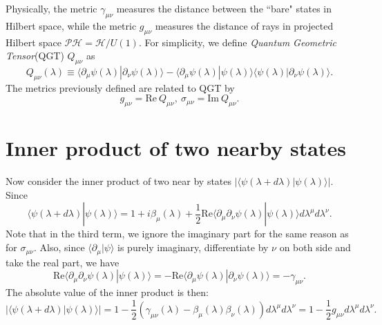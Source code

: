 \documentclass[aps,prb,superscriptaddress]{revtex4}
\begin{document}
Physically, the metric $\gamma_{\mu\nu}$ measures the distance between the ``bare" states in Hilbert space, while the metric $g_{\mu\nu}$ measures the distance of rays in projected Hilbert space $\mathcal{PH} = \mathcal H /U(1)$. For simplicity, we define \textit{Quantum Geometric Tensor}(QGT) $Q_{\mu\nu}$ as
\begin{equation}
	Q_{\mu\nu}(\lambda) \equiv 
	\langle \partial_\mu \psi(\lambda) | \partial_\nu \psi(\lambda) \rangle - 
	\langle \partial_\mu \psi(\lambda) | \psi(\lambda) \rangle 
	\langle \psi(\lambda) | \partial_\nu \psi(\lambda) \rangle.
\end{equation}  
The metrics previously defined are related to QGT by
\begin{equation}
	g_{\mu\nu} = \mathrm{Re}\ Q_{\mu\nu},\ \sigma_{\mu\nu} = \mathrm{Im}\ Q_{\mu\nu}.
\end{equation}

\section{Inner product of two nearby states}
Now consider the inner product of two near by states $|\langle \psi(\lambda+d\lambda) | \psi(\lambda) \rangle|$. Since
\begin{equation}
	\langle \psi(\lambda+d\lambda)| \psi(\lambda)\rangle
	= 1 + i\beta_\mu(\lambda)+\frac{1}{2}\mathrm{Re}\langle \partial_\mu \partial_\nu \psi(\lambda)| \psi(\lambda) \rangle d\lambda^\mu d\lambda^\nu.
\end{equation}
Note that in the third term, we ignore the imaginary part for the same reason as for $\sigma_{\mu\nu}$. Also, since $\langle \partial_\mu| \psi\rangle$ is purely imaginary, differentiate by $\nu$ on both side and take the real part, we have
\begin{equation}
	\mathrm{Re}\langle \partial_\mu \partial_\nu \psi(\lambda)| \psi(\lambda) \rangle
	= -\mathrm{Re}\langle \partial_\mu \psi(\lambda)| \partial_\nu \psi(\lambda) \rangle
	= -\gamma_{\mu\nu}.
\end{equation}  
The absolute value of the inner product is then:
\begin{equation}
	|\langle \psi(\lambda+d\lambda)| \psi(\lambda)\rangle|
	= 1-\frac{1}{2}(\gamma_{\mu\nu}(\lambda)-\beta_\mu(\lambda)\beta_\nu(\lambda)) d\lambda^\mu d\lambda^\nu
	= 1-\frac{1}{2} g_{\mu\nu} d\lambda^\mu d\lambda^\nu.
\end{equation}
\end{document}
